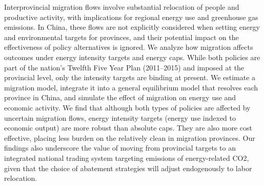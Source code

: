 Interprovincial migration flows involve substantial relocation of people and productive activity, with implications for regional energy use and greenhouse gas emissions. In China, these flows are not explicitly considered when setting energy and environmental targets for provinces, and their potential impact on the effectiveness of policy alternatives is ignored. We analyze how migration affects outcomes under energy intensity targets and energy caps. While both policies are part of the nation's Twelfth Five Year Plan (2011–2015) and imposed at the provincial level, only the intensity targets are binding at present. We estimate a migration model, integrate it into a general equilibrium model that resolves each province in China, and simulate the effect of migration on energy use and economic activity. We find that although both types of policies are affected by uncertain migration flows, energy intensity targets (energy use indexed to economic output) are more robust than absolute caps. They are also more cost effective, placing less burden on the relatively clean in migration provinces. Our findings also underscore the value of moving from provincial targets to an integrated national trading system targeting emissions of energy-related CO2, given that the choice of abatement strategies will adjust endogenously to labor relocation.
